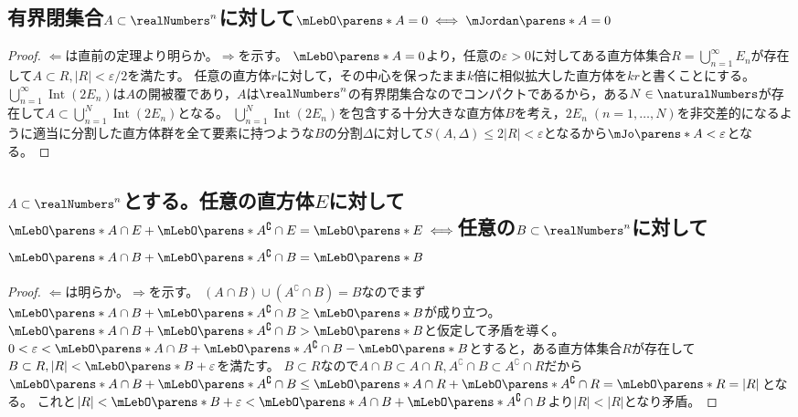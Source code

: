         \subsection{有界閉集合\texorpdfstring{$A\subset\realNumbers^n$}{A⊂R\string^n}に対して\texorpdfstring{$\mLebO\parens*{A}=0 \iff \mJordan\parens*{A}=0$}{AのLebesgue外測度=0 ⇔ AのJordan外測度}}
            \begin{proof}
                $\Leftarrow$は直前の定理より明らか。$\Rightarrow$を示す。
                $\mLebO\parens*{A}=0$より，任意の$\varepsilon>0$に対してある直方体集合$R=\bigcup_{n=1}^\infty E_n$が存在して$A\subset R,|R|<\varepsilon/2$を満たす。
                任意の直方体$r$に対して，その中心を保ったまま$k$倍に相似拡大した直方体を$kr$と書くことにする。
                $\bigcup_{n=1}^\infty \operatorname{Int}(2E_n)$は$A$の開被覆であり，$A$は$\realNumbers^n$の有界閉集合なのでコンパクトであるから，ある$N\in\naturalNumbers$が存在して$A\subset \bigcup_{n=1}^N \operatorname{Int}(2E_n)$となる。
                $\bigcup_{n=1}^N \operatorname{Int}(2E_n)$を包含する十分大きな直方体$B$を考え，$2E_n\;(n=1,\dotsc,N)$を非交差的になるように適当に分割した直方体群を全て要素に持つような$B$の分割$\Delta$に対して$S(A,\Delta) \leq 2|R| <\varepsilon$となるから$\mJo\parens*{A}<\varepsilon$となる。
            \end{proof}
        \subsection{\texorpdfstring{$A\subset\realNumbers^n$}{A⊂R\string^n}とする。任意の直方体\texorpdfstring{$E$}{E}に対して\texorpdfstring{$\mLebO\parens*{A\cap E} + \mLebO\parens*{A^\complement\cap E} = \mLebO\parens*{E} \iff$}{mLo(A∩E) + mLo(A\string^C E) = mLo(E) ⇔}任意の\texorpdfstring{$B\subset\realNumbers^n$}{B⊂R\string^n}に対して\texorpdfstring{$\mLebO\parens*{A\cap B} + \mLebO\parens*{A^\complement\cap B} = \mLebO\parens*{B}$}{mLebo(A∩B) + mLo(A\string^C ∩B)}}
            \begin{proof}
                $\Leftarrow$は明らか。$\Rightarrow$を示す。
                $(A\cap B)\cup(A^\complement\cap B) = B$なのでまず$\mLebO\parens*{A\cap B} + \mLebO\parens*{A^\complement\cap B} \geq \mLebO\parens*{B}$が成り立つ。
                $\mLebO\parens*{A\cap B} + \mLebO\parens*{A^\complement\cap B} > \mLebO\parens*{B}$と仮定して矛盾を導く。
                $0<\varepsilon < \mLebO\parens*{A\cap B} + \mLebO\parens*{A^\complement\cap B} - \mLebO\parens*{B}$とすると，ある直方体集合$R$が存在して$B\subset R,|R| < \mLebO\parens*{B}+\varepsilon$を満たす。
                $B\subset R$なので$A\cap B\subset A\cap R,A^\complement\cap B\subset A^\complement\cap R$だから$\mLebO\parens*{A\cap B} + \mLebO\parens*{A^\complement\cap B} \leq \mLebO\parens*{A\cap R} + \mLebO\parens*{A^\complement\cap R} = \mLebO\parens*{R} = |R|$となる。
                これと$|R| < \mLebO\parens*{B}+\varepsilon < \mLebO\parens*{A\cap B} + \mLebO\parens*{A^\complement\cap B}$より$|R|<|R|$となり矛盾。
            \end{proof}
